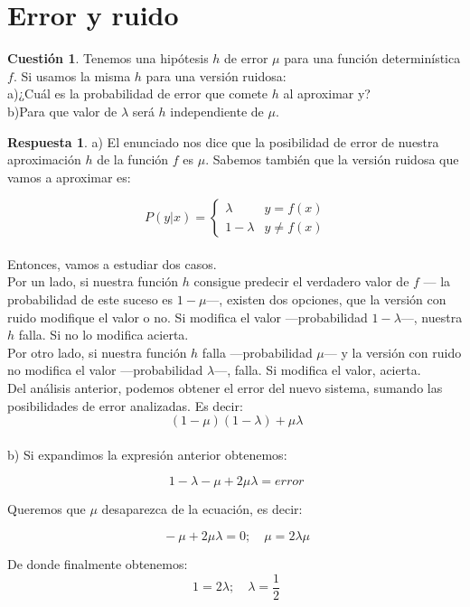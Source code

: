 \documentclass[10pt,a4paper]{article}
\theoremstyle{definition}
\newtheorem*{cuestion}{Cuestión}
\newtheorem*{respuesta}{Respuesta}
\begin{document}
\section{Error y ruido}
\begin{cuestion}
Tenemos una hipótesis $h$ de error $\mu$ para una función determinística $f$. Si usamos la misma $h$ para una versión ruidosa:\\
a)¿Cuál es la probabilidad de error que comete $h$ al aproximar y?\\
b)Para que valor de $\lambda$ será $h$ independiente de $\mu$.
\end{cuestion}
\begin{respuesta}
a) El enunciado nos dice que la posibilidad de error de nuestra aproximación $h$ de la función $f$ es $\mu$. Sabemos también que la versión ruidosa que vamos a aproximar es:

\[
\	P(y|x) =  \begin{cases} \lambda & y=f(x)\\ 1-\lambda & y\neq f(x) \end{cases}
\]\\

Entonces, vamos a estudiar dos casos.\\

Por un lado, si nuestra función $h$ consigue predecir el verdadero valor de $f$ --- la probabilidad de este suceso es $1-\mu$---, existen dos opciones, que la versión con ruido modifique el valor o no. Si modifica el valor ---probabilidad $1-\lambda$---, nuestra $h$ falla. Si no lo modifica acierta.\\

Por otro lado, si nuestra función $h$ falla ---probabilidad $\mu$--- y la versión con ruido no modifica el valor ---probabilidad $\lambda$---, falla. Si modifica el valor, acierta.\\

Del análisis anterior, podemos obtener el error del nuevo sistema, sumando las posibilidades de error analizadas. Es decir:\\
 
\[
\	(1-\mu)(1-\lambda) + \mu \lambda
\]\\

b) Si expandimos la expresión anterior obtenemos:

\[
\ 1-\lambda-\mu+2\mu \lambda = error
\]

Queremos que $\mu$ desaparezca de la ecuación, es decir:

\[
\ -\mu+2\mu \lambda = 0; \quad \mu = 2\lambda \mu
\]

De donde finalmente obtenemos:
\[
\ 1 = 2\lambda; \quad \lambda = \frac{1}{2}
\]

\end{respuesta}
\end{document}
